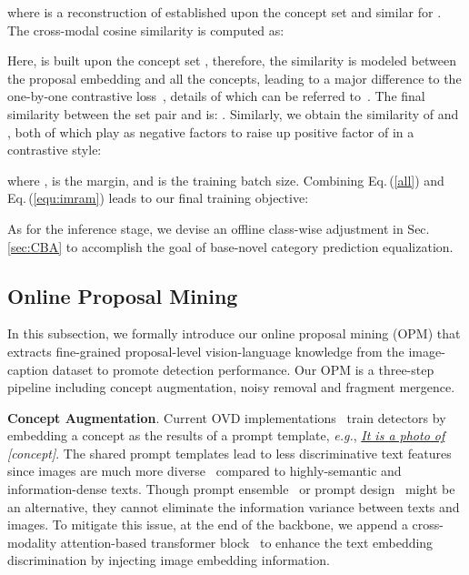 \documentclass[10pt,twocolumn,letterpaper]{article}
\begin{document}
where  is a reconstruction of  established upon the concept set  and similar for . The cross-modal cosine similarity is computed as:




Here,  is built upon the concept set , therefore, the similarity is modeled between the proposal embedding  and all the concepts, leading to a major difference to the one-by-one contrastive loss~\cite{regionCLIP}, details of which can be referred to~\cite{imram}. 
The final similarity between the set pair  and  is: .
Similarly, we obtain the similarity of  and , both of which play as negative factors to raise up positive factor of  in a contrastive style:

where ,  is the margin, and  is the training batch size.
Combining Eq.\,(\ref{all}) and Eq.\,(\ref{equ:imram}) leads to our final training objective:




As for the inference stage, we devise an offline class-wise adjustment in Sec.\,\ref{sec:CBA} to accomplish the goal of base-novel category prediction equalization.


















\subsection{Online Proposal Mining}
\label{sec:OPM}


In this subsection, we formally introduce our online proposal mining (OPM) that extracts fine-grained proposal-level vision-language knowledge from the image-caption dataset  to promote detection performance.
Our OPM is a three-step pipeline including concept augmentation, noisy removal and fragment mergence.



\textbf{Concept Augmentation}. Current OVD implementations~\cite{regionCLIP,vild,detic} train detectors by embedding a concept as the results of a prompt template, \emph{e.g.}, \textit{\underline{It is a photo of} [concept]}. The shared prompt templates lead to less discriminative text features since images are much more diverse~\cite{he2021masked} compared to highly-semantic and information-dense texts. 
Though prompt ensemble~\cite{vild} or prompt design~\cite{DetPro} might be an alternative, they cannot eliminate the information variance between texts and images.
To mitigate this issue, at the end of the backbone, we append a cross-modality attention-based transformer block~\cite{ViT} to enhance the text embedding discrimination by injecting image embedding information. 
\end{document}
